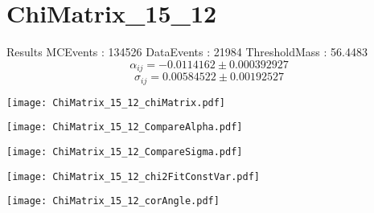 \documentclass[a4paper,12pt]{article}
\begin{document}
\section{ChiMatrix\_15\_12}
\begin{minipage}{0.49\linewidth} Results \newline
MCEvents : 134526\newline
DataEvents : 21984 \newline
ThresholdMass : 56.4483\\
$$\alpha_{ij} = -0.0114162\pm 0.000392927$$
$$\sigma_{ij} = 0.00584522\pm 0.00192527$$
\end{minipage}\hfill
\begin{minipage}{0.49\linewidth} 
\texttt{[image: ChiMatrix\_15\_12\_chiMatrix.pdf]}\\
\end{minipage}
\hfill
\begin{minipage}{0.49\linewidth} 
\texttt{[image: ChiMatrix\_15\_12\_CompareAlpha.pdf]}\\
\end{minipage}
\hfill
\begin{minipage}{0.49\linewidth} 
\texttt{[image: ChiMatrix\_15\_12\_CompareSigma.pdf]}\\
\end{minipage}
\begin{minipage}{0.49\linewidth} 
\texttt{[image: ChiMatrix\_15\_12\_chi2FitConstVar.pdf]}\\
\end{minipage}
\hfill
\begin{minipage}{0.49\linewidth} 
\texttt{[image: ChiMatrix\_15\_12\_corAngle.pdf]}\\
\end{minipage}
\end{document}
